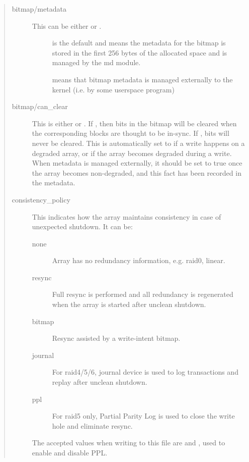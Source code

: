 \documentclass[a4paper,8pt,english]{sphinxmanual}
\begin{document}
\begin{quote}
\begin{description}
\item[{bitmap/metadata}] \leavevmode
This can be either  or .
\begin{description}
\item[{}] \leavevmode
is the default and means the metadata for the bitmap
is stored in the first 256 bytes of the allocated space and is
managed by the md module.

\item[{}] \leavevmode
means that bitmap metadata is managed externally to
the kernel (i.e. by some userspace program)

\end{description}

\item[{bitmap/can\_clear}] \leavevmode
This is either  or .  If , then bits in the
bitmap will be cleared when the corresponding blocks are thought
to be in-sync.  If , bits will never be cleared.
This is automatically set to  if a write happens on a
degraded array, or if the array becomes degraded during a write.
When metadata is managed externally, it should be set to true
once the array becomes non-degraded, and this fact has been
recorded in the metadata.

\item[{consistency\_policy}] \leavevmode
This indicates how the array maintains consistency in case of unexpected
shutdown. It can be:
\begin{description}
\item[{none}] \leavevmode
Array has no redundancy information, e.g. raid0, linear.

\item[{resync}] \leavevmode
Full resync is performed and all redundancy is regenerated when the
array is started after unclean shutdown.

\item[{bitmap}] \leavevmode
Resync assisted by a write-intent bitmap.

\item[{journal}] \leavevmode
For raid4/5/6, journal device is used to log transactions and replay
after unclean shutdown.

\item[{ppl}] \leavevmode
For raid5 only, Partial Parity Log is used to close the write hole and
eliminate resync.

\end{description}

The accepted values when writing to this file are  and ,
used to enable and disable PPL.

\end{description}
\end{quote}
\end{document}
